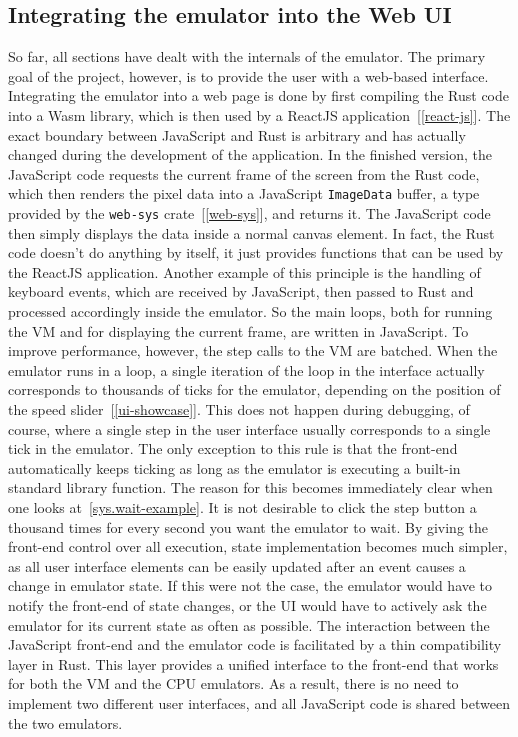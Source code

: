 \subsection{Integrating the emulator into the Web UI}
So far, all sections have dealt with the internals of the emulator.
The primary goal of the project, however, is to provide the user with a web-based interface.
Integrating the emulator into a web page is done by first compiling the Rust code into a Wasm library, which is then used by a ReactJS application~[\ref{react-js}].
The exact boundary between JavaScript and Rust is arbitrary and has actually changed during the development of the application.
In the finished version, the JavaScript code requests the current frame of the screen from the Rust code, which then renders the pixel data into a JavaScript \verb+ImageData+ buffer, a type provided by the \verb+web-sys+ crate~[\ref{web-sys}], and returns it.
The JavaScript code then simply displays the data inside a normal canvas element.
In fact, the Rust code doesn't do anything by itself, it just provides functions that can be used by the ReactJS application.
Another example of this principle is the handling of keyboard events, which are received by JavaScript, then passed to Rust and processed accordingly inside the emulator.
So the main loops, both for running the VM and for displaying the current frame, are written in JavaScript.
To improve performance, however, the step calls to the VM are batched.
When the emulator runs in a loop, a single iteration of the loop in the interface actually corresponds to thousands of ticks for the emulator, depending on the position of the speed slider~[\ref{ui-showcase}].
This does not happen during debugging, of course, where a single step in the user interface usually corresponds to a single tick in the emulator.
The only exception to this rule is that the front-end automatically keeps ticking as long as the emulator is executing a built-in standard library function.
The reason for this becomes immediately clear when one looks at~\cref{sys.wait-example}.
It is not desirable to click the step button a thousand times for every second you want the emulator to wait.
By giving the front-end control over all execution, state implementation becomes much simpler, as all user interface elements can be easily updated after an event causes a change in emulator state.
If this were not the case, the emulator would have to notify the front-end of state changes, or the UI would have to actively ask the emulator for its current state as often as possible.
The interaction between the JavaScript front-end and the emulator code is facilitated by a thin compatibility layer in Rust.
This layer provides a unified interface to the front-end that works for both the VM and the CPU emulators.
As a result, there is no need to implement two different user interfaces, and all JavaScript code is shared between the two emulators.


